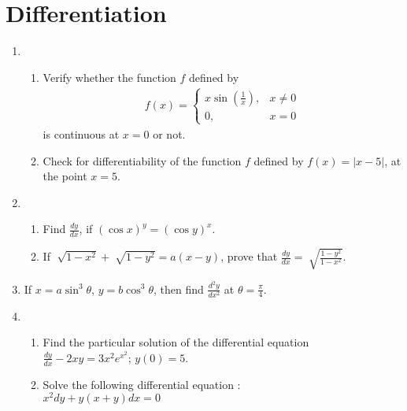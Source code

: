 \documentclass[12pt,-letter paper]{article}
\providecommand{\brak}[1]{\ensuremath{\left(#1\right)}}
\begin{document}
\section {Differentiation}
\begin {enumerate}
\item \begin {enumerate}                                                                                   \item Verify whether the function $f$ defined by                                                              \begin{align*}
                f(x) = \begin{cases} x\sin\left(\frac{1}{x}\right), & x\neq 0 \\ 0, & x = 0 \end{cases}            \end{align*}
        is continuous at $x=0$ or not.                                                                                     \item Check for differentiability of the function $f$ defined by $f(x) = |x-5|$, at the point $x=5$.
      \end {enumerate}
\item \begin {enumerate}                                                                                                   \item Find $\frac{dy}{dx}$, if $\brak{\cos x}^y = \brak{\cos y}^x$.
\item If $\sqrt[]{1-x^2} + \sqrt[]{1-y^2} = a\brak{x - y}$, prove that $\frac{dy}{dx} = \sqrt[]{\frac{1-y^2}{1-x^2}}$.
        \end {enumerate}
                                                                                                           
\item If $x = a \sin^3\theta$, $y = b\cos^3\theta$, then find $\frac{d^2y}{dx^2}$ at $\theta = \frac{\pi}{4}$.                                                                                                        \item \begin {enumerate}
\item Find the particular solution of the differential equation\\ $\frac{dy}{dx} - 2xy = 3x^2 e^{x^2}$; $y(0) = 5$.
\item Solve the following differential equation :\\ $x^2 dy + y(x+y) dx =0$
        \end {enumerate}
\end {enumerate}
\end{document}
